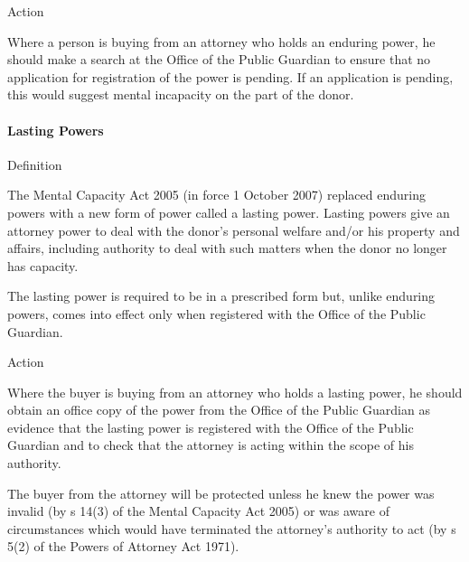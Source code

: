 \documentclass[
]{article}
\newenvironment{env-a1c35d52-c355-4524-93c6-325e9133bd60}
{
    \savenotes\tcolorbox[blanker,breakable,left=5pt,borderline west={2pt}{-4pt}{aquamarine}]
}
{
    \endtcolorbox\spewnotes
}
\newenvironment{env-68b88379-d4cc-4b35-9b80-2115e064fa9f}
{
    \savenotes\tcolorbox[blanker,breakable,left=5pt,borderline west={2pt}{-4pt}{gold}]
}
{
    \endtcolorbox\spewnotes
}
\begin{document}
\begin{env-a1c35d52-c355-4524-93c6-325e9133bd60}

Action

Where a person is buying from an attorney who holds an enduring power,
he should make a search at the Office of the Public Guardian to ensure
that no application for registration of the power is pending. If an
application is pending, this would suggest mental incapacity on the part
of the donor.

\end{env-a1c35d52-c355-4524-93c6-325e9133bd60}

\hypertarget{lasting-powers}{%
\paragraph{Lasting Powers}\label{lasting-powers}}

\begin{env-68b88379-d4cc-4b35-9b80-2115e064fa9f}

Definition

The Mental Capacity Act 2005 (in force 1 October 2007) replaced enduring
powers with a new form of power called a lasting power. Lasting powers
give an attorney power to deal with the donor's personal welfare and/or
his property and affairs, including authority to deal with such matters
when the donor no longer has capacity.

\end{env-68b88379-d4cc-4b35-9b80-2115e064fa9f}

The lasting power is required to be in a prescribed form but, unlike
enduring powers, comes into effect only when registered with the Office
of the Public Guardian.

\begin{env-a1c35d52-c355-4524-93c6-325e9133bd60}

Action

Where the buyer is buying from an attorney who holds a lasting power, he
should obtain an office copy of the power from the Office of the Public
Guardian as evidence that the lasting power is registered with the
Office of the Public Guardian and to check that the attorney is acting
within the scope of his authority.

The buyer from the attorney will be protected unless he knew the power
was invalid (by s 14(3) of the Mental Capacity Act 2005) or was aware of
circumstances which would have terminated the attorney's authority to
act (by s 5(2) of the Powers of Attorney Act 1971).

\end{env-a1c35d52-c355-4524-93c6-325e9133bd60}
\end{document}
